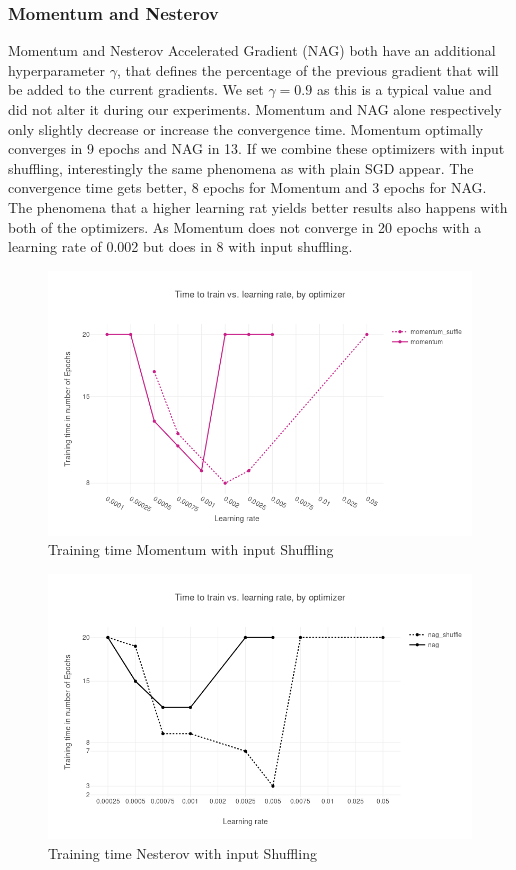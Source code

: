 \subsubsection{Momentum and Nesterov}
Momentum and  Nesterov Accelerated Gradient (NAG) \cite{nag} both have an additional hyperparameter $\gamma$, that defines the percentage of the previous gradient that will be added to the current gradients. We set $\gamma = 0.9$ as this is a typical value and did not alter it during our experiments. Momentum and NAG alone respectively only slightly decrease or increase the convergence time. Momentum optimally converges in 9 epochs and NAG in 13. If we combine these optimizers with input shuffling, interestingly the same phenomena as with plain SGD appear. The convergence time gets better, 8 epochs for Momentum and 3 epochs for NAG. The phenomena that a higher learning rat yields better results also happens with both of the optimizers. As Momentum does not converge in 20 epochs with a learning rate of 0.002 but does in 8 with input shuffling.
\begin{figure}[h]
\centering

\includegraphics[scale=0.3]{images/results_mom_shuffle}
\caption{Training time Momentum with input Shuffling}
\label{fig:results_mom}
\end{figure}

\begin{figure}[h]
\centering
\includegraphics[scale=0.3]{images/results_nag_shuffle}
\caption{Training time Nesterov with input Shuffling}
\label{fig:results_nag}
\end{figure}
